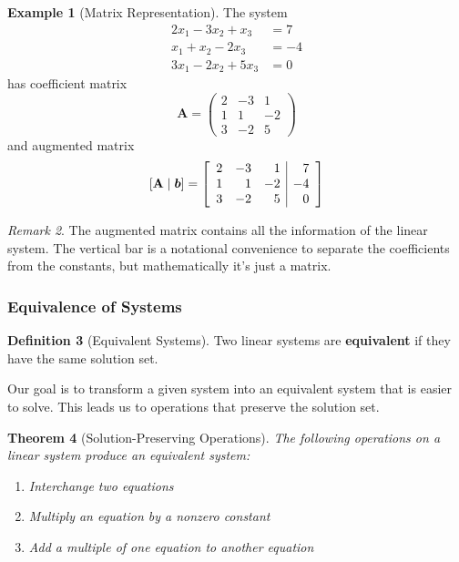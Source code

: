 \documentclass[12pt]{article}
\numberwithin{equation}{section}
\newcommand{\vect}[1]{\boldsymbol{#1}}   %
\newcommand{\mat}[1]{\mathbf{#1}}        %
\newenvironment{amatrix}[1]{%
  \left[\begin{array}{#1}}
  {\end{array}\right]}
\theoremstyle{plain}
\newtheorem{theorem}{Theorem}[section]
\theoremstyle{definition}
\newtheorem{definition}[theorem]{Definition}
\newtheorem{example}[theorem]{Example}
\theoremstyle{remark}
\newtheorem{remark}[theorem]{Remark}
\begin{document}
\begin{example}[Matrix Representation]
The system
\begin{align}
2x_1 - 3x_2 + x_3 &= 7\\
x_1 + x_2 - 2x_3 &= -4\\
3x_1 - 2x_2 + 5x_3 &= 0
\end{align}
has coefficient matrix
$$\mat{A} = \begin{pmatrix}
2 & -3 & 1\\
1 & 1 & -2\\
3 & -2 & 5
\end{pmatrix}$$
and augmented matrix
$$[\mat{A}\mid\vect{b}] = \begin{amatrix}{rrr|r}
2 & -3 & 1 & 7\\
1 & 1 & -2 & -4\\
3 & -2 & 5 & 0
\end{amatrix}$$
\end{example}

\begin{remark}
The augmented matrix contains all the information of the linear system. The vertical bar is a notational convenience to separate the coefficients from the constants, but mathematically it's just a matrix.
\end{remark}

\subsubsection{Equivalence of Systems}

\begin{definition}[Equivalent Systems]
Two linear systems are \textbf{equivalent} if they have the same solution set.
\end{definition}

Our goal is to transform a given system into an equivalent system that is easier to solve. This leads us to operations that preserve the solution set.

\begin{theorem}[Solution-Preserving Operations]
The following operations on a linear system produce an equivalent system:
\begin{enumerate}
\item Interchange two equations
\item Multiply an equation by a nonzero constant
\item Add a multiple of one equation to another equation
\end{enumerate}
\end{theorem}
\end{document}

